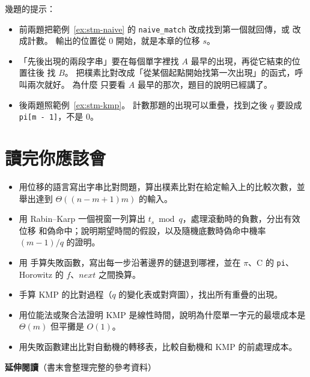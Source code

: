 幾題的提示：

\begin{itemize}
\item 前兩題把範例~\ref{ex:stm-naive} 的 \texttt{naive\_match} 改成找到第一個就回傳，或
改成計數。 輸出的位置從 $0$ 開始，就是本章的位移 $s$。
\item 「先後出現的兩段字串」要在每個單字裡找 $A$ 最早的出現，再從它結束的位置往後
找 $B$。 把樸素比對改成「從某個起點開始找第一次出現」的函式，呼叫兩次就好。 為什麼
只要看 $A$ 最早的那次，題目的說明已經講了。
\item 後兩題照範例~\ref{ex:stm-kmp}。 計數那題的出現可以重疊，找到之後 $q$ 要設成
\texttt{pi[m - 1]}，不是 $0$。
\end{itemize}

\section{讀完你應該會}
\label{sec:stm-checklist}

\begin{itemize}
\item 用位移的語言寫出字串比對問題，算出樸素比對在給定輸入上的比較次數，並舉出達到
$\Theta((n - m + 1)m)$ 的輸入。
\item 用 Rabin--Karp 一個視窗一列算出 $t_s \bmod q$，處理滾動時的負數，分出有效位移
和偽命中；說明期望時間的假設，以及隨機底數時偽命中機率 $(m - 1)/q$ 的證明。
\item 用  手算失敗函數，寫出每一步沿著邊界的鏈退到哪裡，並在
$\pi$、C 的 \texttt{pi}、Horowitz 的 $f$、$\mathit{next}$ 之間換算。
\item 手算 KMP 的比對過程（$q$ 的變化表或對齊圖），找出所有重疊的出現。
\item 用位能法或聚合法證明 KMP 是線性時間，說明為什麼單一字元的最壞成本是
$\Theta(m)$ 但平攤是 $O(1)$。
\item 用失敗函數建出比對自動機的轉移表，比較自動機和 KMP 的前處理成本。
\end{itemize}

\textbf{延伸閱讀}（書末會整理完整的參考資料）

